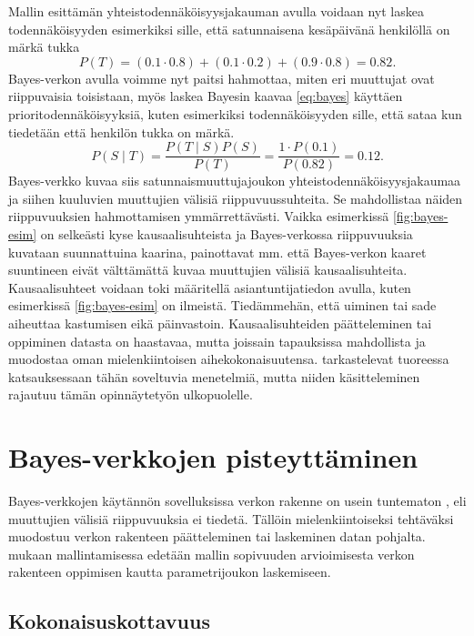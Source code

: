 Mallin esittämän yhteistodennäköisyysjakauman avulla voidaan nyt laskea todennäköisyyden esimerkiksi sille, että satunnaisena kesäpäivänä henkilöllä on märkä tukka 
$$ 
    P(T) = (0.1\cdot0.8) + (0.1\cdot0.2) + (0.9\cdot0.8) = 0.82. 
$$ 
Bayes-verkon avulla voimme nyt paitsi hahmottaa, miten eri muuttujat ovat riippuvaisia toisistaan, myös laskea Bayesin kaavaa \ref{eq:bayes} käyttäen prioritodennäköisyyksiä, kuten esimerkiksi todennäköisyyden sille, että sataa kun tiedetään että henkilön tukka on märkä. 
$$ 
  P(S \mid T) = \frac{P(T \mid S)P(S)}{P(T)} = \frac{1 \cdot P(0.1)}{P(0.82)} = 0.12.    
$$ 
Bayes-verkko kuvaa siis satunnaismuuttujajoukon yhteistodennäköisyysjakaumaa ja siihen kuuluvien muuttujien välisiä riippuvuussuhteita. Se mahdollistaa näiden riippuvuuksien hahmottamisen ymmärrettävästi. Vaikka esimerkissä \ref{fig:bayes-esim} on selkeästi kyse kausaalisuhteista ja Bayes-verkossa riippuvuuksia kuvataan suunnattuina kaarina, painottavat mm. \citet{ruggeri_bayesian_2008, myllymaki_bayes-verkkojen_1998} että Bayes-verkon kaaret suuntineen eivät välttämättä kuvaa muuttujien välisiä kausaalisuhteita. Kausaalisuhteet voidaan toki määritellä asiantuntijatiedon avulla, kuten esimerkissä \ref{fig:bayes-esim} on ilmeistä. Tiedämmehän, että uiminen tai sade aiheuttaa kastumisen eikä päinvastoin. Kausaalisuhteiden päätteleminen tai oppiminen datasta on haastavaa, mutta joissain tapauksissa mahdollista ja muodostaa oman mielenkiintoisen aihekokonaisuutensa. \citet{vowels_dya_2022} tarkastelevat tuoreessa katsauksessaan tähän soveltuvia menetelmiä, mutta niiden käsitteleminen rajautuu tämän opinnäytetyön ulkopuolelle. 

\section{Bayes-verkkojen pisteyttäminen} 

Bayes-verkkojen käytännön sovelluksissa verkon rakenne on usein tuntematon \citep{ruggeri_bayesian_2008}, eli muuttujien välisiä riippuvuuksia ei tiedetä. Tällöin mielenkiintoiseksi tehtäväksi muodostuu verkon rakenteen päätteleminen tai laskeminen datan pohjalta. \citet{myllymaki_bayes-verkkojen_1998} mukaan mallintamisessa edetään mallin sopivuuden arvioimisesta verkon rakenteen oppimisen kautta parametrijoukon laskemiseen. 

\subsection{Kokonaisuskottavuus} 

